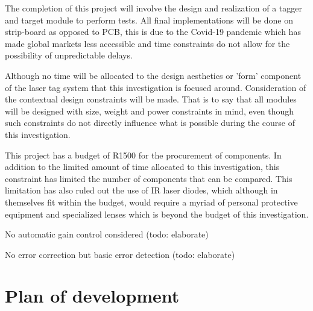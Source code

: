 The completion of this project will involve the design and realization of a tagger and target module to perform tests. All final implementations will be done on strip-board as opposed to PCB, this is due to the Covid-19 pandemic which has made global markets less accessible and time constraints do not allow for the possibility of unpredictable delays.

Although no time will be allocated to the design aesthetics or 'form' component of the laser tag system that this investigation is focused around. Consideration of the contextual design constraints will be made. That is to say that all modules will be designed with size, weight and power constraints in mind, even though such constraints do not directly influence what is possible during the course of this investigation.

This project has a budget of R1500 for the procurement of components. In addition to the limited amount of time allocated to this investigation, this constraint has limited the number of components that can be compared. This limitation has also ruled out the use of IR laser diodes, which although in themselves fit within the budget, would require a myriad of personal protective equipment and specialized lenses which is beyond the budget of this investigation.

No automatic gain control considered (todo: elaborate)

No error correction but basic error detection (todo: elaborate)





\section{Plan of development}


